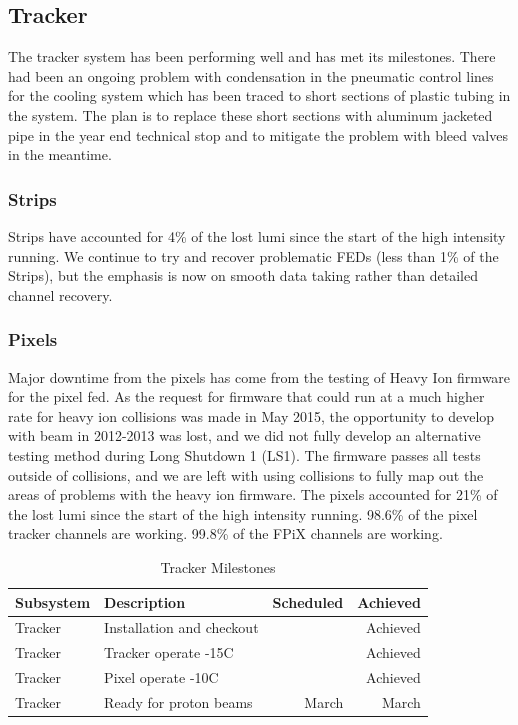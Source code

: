 \subsection{Tracker }
The tracker system has been performing well and has met its milestones. 
There had been an ongoing problem with condensation in the pneumatic control lines for the cooling
system which  has been traced to short sections of plastic
tubing in the system. The plan is to replace these short sections
with aluminum jacketed pipe in the year end technical stop and
to mitigate the problem with bleed valves in the meantime.


\subsubsection{Strips }

Strips have accounted for 4\% of the lost lumi since the start of the
high intensity running. We continue to try and recover problematic
FEDs (less than 1\% of the Strips), but the emphasis is now on smooth
data taking rather than detailed channel recovery.

\subsubsection{Pixels }

Major downtime from the pixels has come from the testing of Heavy Ion
firmware for the pixel fed. As the request for firmware that could run
at a much higher rate for heavy ion collisions was made in May 2015,
the opportunity to develop with beam in 2012-2013 was lost, and we did not
fully develop an alternative testing method during Long Shutdown 1 (LS1).
The firmware passes all tests outside of collisions, and we are left with
using collisions to fully map out the areas of problems with the heavy
ion firmware. The pixels accounted for 21\% of the lost lumi since the
start of the high intensity running. 98.6\% of the pixel tracker channels
are working. 99.8\% of the FPiX channels are working.




\begin{table}[htp]
\caption{Tracker Milestones}
\begin{center}
\begin{tabular}{|l|l|r|r|}
\hline
Subsystem&Description&Scheduled&Achieved\\
\hline
Tracker & Installation and checkout& & Achieved\\
\hline
Tracker & Tracker operate -15C & & Achieved\\
\hline
Tracker & Pixel operate -10C & & Achieved\\
\hline
Tracker& Ready for proton beams& March & March\\
\hline
\end{tabular}
\end{center}
\label{TrackerMilestones}
\end{table}%

